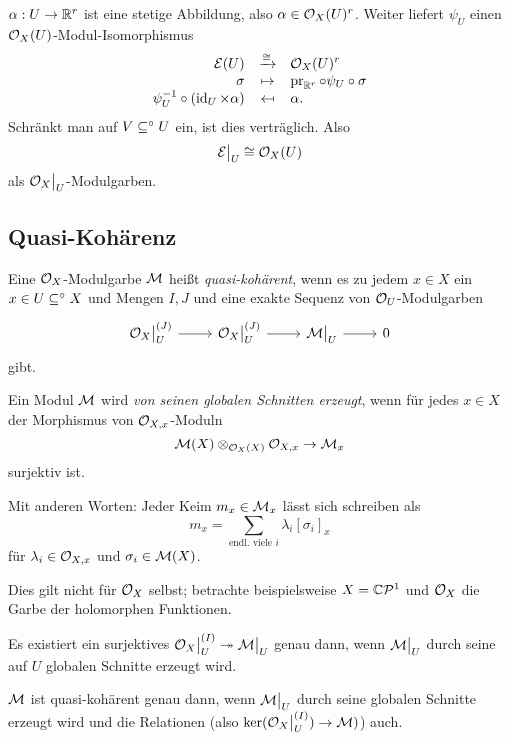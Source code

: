 $\alpha: U \to \mathbb{R}^r$ ist eine stetige Abbildung, also
$\alpha \in \mathcal{O}_X(U)^r$. Weiter liefert $\psi_U$ einen 
$\mathcal{O}_X(U)$-Modul-Isomorphismus
\[
    \funcdef{ \cal E(U) & \xto{\cong} & \O_X(U)^r \\ 
        \sigma & \mapsto & \pr_{\R^r} \circ \psi_U \circ \sigma \\
        \psi_U\inv \circ (\id_U \times \alpha)  & \mapsfrom & \alpha.}
\]
Schränkt man auf $V \subseteq^\circ U$ ein, ist dies verträglich. Also
\[ \mathcal E\big|_{U} \cong \mathcal{O}_X(U)\]
als $\mathcal{O}_X\big|_{U}$-Modulgarben.

\subsection{Quasi-Kohärenz}

\begin{definition}
    Eine $\mathcal{O}_X$-Modulgarbe $\mathcal{M}$ heißt \emph{quasi-kohärent}, wenn es
    zu jedem $x\in X$ ein $x \in U \subseteq^\circ X$ und Mengen $I,J$ und
    eine exakte Sequenz von $\mathcal{O}_U$-Modulgarben
    \[\begin{tikzcd}
        \O_X\rest U^{(J)} \rar &\O_X\rest U^{(J)} \rar &
        \M\rest U \rar & 0
    \end{tikzcd}\]
    gibt.
\end{definition}

\begin{definition}
    Ein \OX Modul $\mathcal{M}$ wird \emph{von seinen globalen Schnitten erzeugt},
    wenn für jedes $x\in X$ der Morphismus von $\mathcal{O}_{X,x}$-Moduln
    \[ \mathcal{M}(X) \otimes_{\mathcal{O}_X(X)} \mathcal{O}_{X,x} \to \mathcal{M}_x\]
    surjektiv ist.
\end{definition}

Mit anderen Worten: Jeder Keim $m_x \in \mathcal{M}_x$ lässt sich schreiben als
\[ m_x = \sum_{\text{endl. viele }i} \lambda_i [\sigma_i]_x\]
für $\lambda_i \in \mathcal{O}_{X,x}$ und $\sigma_i \in \mathcal{M}(X)$.

Dies gilt nicht für $\mathcal{O}_X$ selbst; betrachte beispielsweise
$X = \mathbb{C}\mathcal P^1$ und $\mathcal{O}_X$ die Garbe der holomorphen Funktionen.

\begin{bemerkung}
    Es existiert ein surjektives 
    $\mathcal{O}_X\big|_{U}^{(I)} \twoheadrightarrow \mathcal{M}\big|_{U}$ genau dann, wenn
    $\mathcal{M}\big|_{U}$ durch seine auf $U$ globalen Schnitte erzeugt wird.
    
    $\mathcal{M}$ ist quasi-kohärent genau dann, wenn
    $\mathcal{M}\big|_{U}$ durch seine globalen Schnitte erzeugt wird und die Relationen
    (also $\ker(\mathcal{O}_X\big|_{U}^{(I)}) \to \mathcal{M})$) auch.  
\end{bemerkung}

